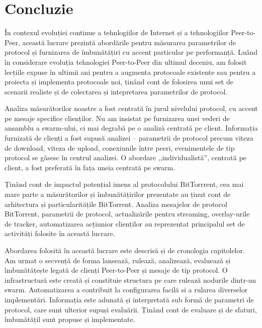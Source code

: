 
\chapter{Concluzie}
\label{chapter:conclusion}

În contexul evoluției continue a tehnlogiilor de Internet și a tehnologiilor
Peer-to-Peer, această lucrare prezintă abordările pentru măsurarea
parametrilor de protocol și furnizarea de îmbunătățiri cu accent particular pe
performanță. Luând în considerare evoluția tehnologiei Peer-to-Peer din
ultimul deceniu, am folosit lecțiile expuse în ultimii ani pentru a augmenta
protocoale existente sau pentru a proiecta și implementa protocoale noi, ținând
cont de folosirea unui set de scenarii realiste și de colectarea și
intepretarea parametrilor de protocol.

Analiza măsurătorilor noastre a fost centrată în jurul nivelului protocol, cu
accent pe mesaje specifice clienților. Nu am insistat pe furnizarea unei
vederi de ansamblu a swarm-ului, ci mai degrabă pe o analiză centrată pe
client. Informația furnizată de clienți a fost supusă analizei -- parametrii de
protocol precum viteza de download, viteza de upload, conexiunile între peeri,
evenimentele de tip protocol se găsesc în centrul analizei. O abordare
,,individualistă'', centrată pe client, a fost preferată în fața uneia centrată
pe swarm.

Ținând cont de impactul potențial imens al protocolului BitTorrrent, cea mai
mare parte a măsurătorilor și îmbunătățirilor prezentate au ținut cont de
arhitectura și particularitățile BitTorrent. Analiza mesajelor de protocol
BitTorrent, parametrii de protocol, actualizările pentru streaming,
overlay-urile de tracker, automatizarea acțiunior clienților au reprezentat
principalul set de activități folosite în această lucrare.

Abordarea folosită în această lucrare este descrisă și de cronologia
capitolelor. Am urmat o secvență de forma lansează, rulează, analizează,
evaluează și îmbunătățește legată de clienți Peer-to-Peer și mesaje de tip
protocol. O infrastructură este creată și constituie structura pe care rulează
nodurile dintr-un swarm. Automatizarea a contribuit la configurarea facilă si
a rularea diverselor implementări. Informația este adunată și interpretată sub
formă de parametri de protocol, care sunt ulterior supuși evaluării. Ținând
cont de evaluare și de sfaturi, îmbunătățil sunt propuse și implementate.

